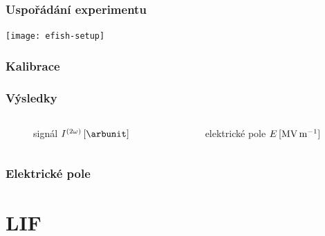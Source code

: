 \documentclass[10pt]{beamer}
\begin{document}
\begin{frame}
	\frametitle{Uspořádání experimentu}
	\texttt{[image: efish-setup]}
\end{frame}

\begin{frame}
	\frametitle{Kalibrace}
	
\end{frame}

\begin{frame}
	\frametitle{Výsledky}
	\begin{columns}
	\begin{column}{0.5\textwidth}
		\begin{figure}
			\centering
			\small
			signál \EFISH{} $\efish\,[\si{\arbunit}]$
			\medskip\par
			
		\end{figure}
	\end{column}
	\begin{column}{0.5\textwidth}
		\begin{figure}
			\centering
			\small
			elektrické pole $E\,[\si{\mega\volt\per\metre}]$
			\medskip\par
			
		\end{figure}
	\end{column}
	\end{columns}
\end{frame}

\begin{frame}
	\frametitle{Elektrické pole}
	\begin{figure}
		\centering
		
	\end{figure}
\end{frame}

\section{LIF}
\graphicspath{
	{../lif/}
	{img}
}
\end{document}
